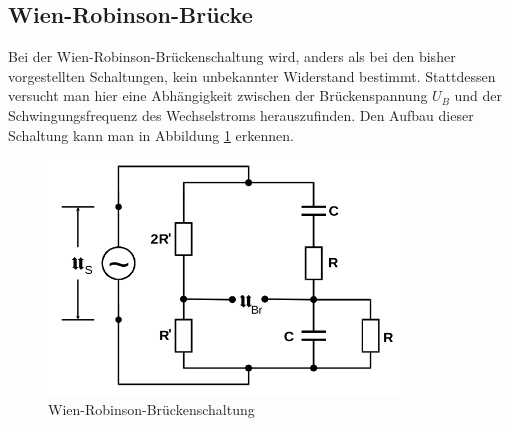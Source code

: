 \subsection{Wien-Robinson-Brücke}

Bei der Wien-Robinson-Brückenschaltung wird, anders als bei den bisher
vorgestellten Schaltungen, kein unbekannter Widerstand bestimmt.
Stattdessen versucht man hier eine Abhängigkeit zwischen der Brückenspannung
$U_B$ und der Schwingungsfrequenz \omega des Wechselstroms herauszufinden.
Den Aufbau dieser Schaltung kann man in Abbildung \ref{fig:WRBr} erkennen.

\begin{figure}[h]
  \centering
  \includegraphics[height=6.25cm]{WRBr.png}
  \caption{Wien-Robinson-Brückenschaltung \cite{anleitung}}
  \label{fig:WRBr}
\end{figure}

